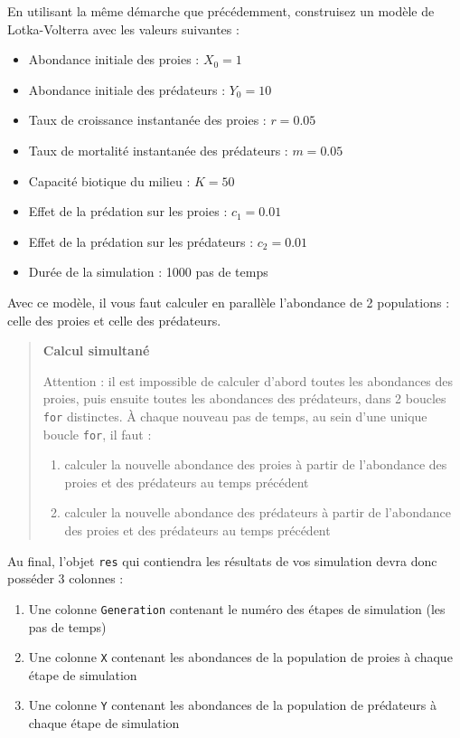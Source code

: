 \documentclass[
  french,
  a4paper,
  DIV=11,
  numbers=noendperiod,
  oneside]{scrreprt}
\providecommand{\tightlist}{%
  \setlength{\itemsep}{0pt}\setlength{\parskip}{0pt}}
\begin{document}
\begin{tcolorbox}
En utilisant la même démarche que précédemment, construisez un modèle de
Lotka-Volterra avec les valeurs suivantes :

\begin{itemize}
\tightlist
\item
  Abondance initiale des proies : \(X_0 = 1\)
\item
  Abondance initiale des prédateurs : \(Y_0 = 10\)
\item
  Taux de croissance instantanée des proies : \(r = 0.05\)
\item
  Taux de mortalité instantanée des prédateurs : \(m = 0.05\)
\item
  Capacité biotique du milieu : \(K = 50\)
\item
  Effet de la prédation sur les proies : \(c_1 = 0.01\)
\item
  Effet de la prédation sur les prédateurs : \(c_2 = 0.01\)
\item
  Durée de la simulation : 1000 pas de temps
\end{itemize}

Avec ce modèle, il vous faut calculer en parallèle l'abondance de 2
populations : celle des proies et celle des prédateurs.

\begin{quote}
\textbf{Calcul simultané}

Attention : il est impossible de calculer d'abord toutes les abondances
des proies, puis ensuite toutes les abondances des prédateurs, dans 2
boucles \texttt{for} distinctes. À chaque nouveau pas de temps, au sein
d'une unique boucle \texttt{for}, il faut :

\begin{enumerate}
\def\labelenumi{\arabic{enumi}.}
\tightlist
\item
  calculer la nouvelle abondance des proies à partir de l'abondance des
  proies et des prédateurs au temps précédent
\item
  calculer la nouvelle abondance des prédateurs à partir de l'abondance
  des proies et des prédateurs au temps précédent
\end{enumerate}
\end{quote}

Au final, l'objet \texttt{res} qui contiendra les résultats de vos
simulation devra donc posséder 3 colonnes :

\begin{enumerate}
\def\labelenumi{\arabic{enumi}.}
\tightlist
\item
  Une colonne \texttt{Generation} contenant le numéro des étapes de
  simulation (les pas de temps)
\item
  Une colonne \texttt{X} contenant les abondances de la population de
  proies à chaque étape de simulation
\item
  Une colonne \texttt{Y} contenant les abondances de la population de
  prédateurs à chaque étape de simulation
\end{enumerate}


\end{tcolorbox}
\end{document}
